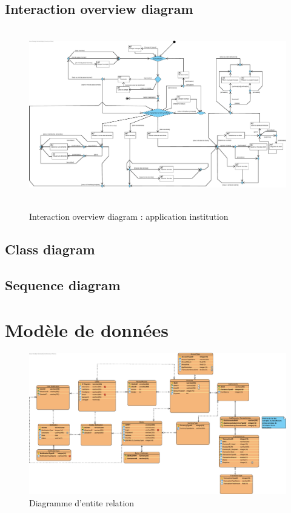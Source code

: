 \documentclass[]{report}
\begin{document}
\subsection{Interaction overview diagram}



\vspace{2.5cm}
\begin{figure}[h!]
\hbox{
	\centering\includegraphics[width=\linewidth]{img/Interaction Overview Institution.pdf}
}
\caption{Interaction overview diagram : application institution}
\end{figure}

\newpage

\subsection{Class diagram}

\newpage

\subsection{Sequence diagram}

\newpage



\section{Modèle de données}

\begin{figure}[h]
	\centering\includegraphics[width=\linewidth]{img/BDD.pdf}
	\caption{Diagramme d'entite relation}
\end{figure}

\end{document}
